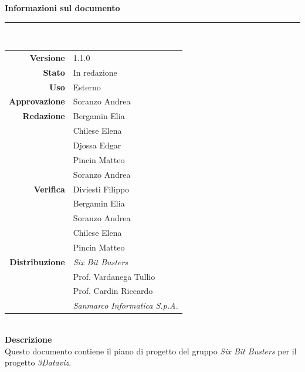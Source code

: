 \begin{titlepage}
\begin{center}
	\large \textbf{Informazioni sul documento} \\
	\rule{0.6\textwidth}{0.4pt}
	\\[0.5cm]
	\begin{tabular}{r|l}
		\textbf{Versione} & 1.1.0\\
		\textbf{Stato} & In redazione\\
		\textbf{Uso} & Esterno\\                         
		\textbf{Approvazione} & Soranzo Andrea\\                      
		\textbf{Redazione} & Bergamin Elia \\ & Chilese Elena \\ & Djossa Edgar \\ & Pincin Matteo\\ & Soranzo Andrea\\
		\textbf{Verifica} &  Diviesti Filippo \\ & Bergamin Elia \\ & Soranzo Andrea \\ & Chilese Elena\\ & Pincin Matteo\\                        
		\textbf{Distribuzione} & \textit{Six Bit Busters} \\ & Prof. Vardanega Tullio \\ & Prof. Cardin Riccardo \\ & \textit{Sanmarco Informatica S.p.A.}
	\end{tabular}	
	\\[0.8cm]

	\large \textbf{Descrizione} \\
	Questo documento contiene il piano di progetto del gruppo \textit{Six Bit Busters} per il progetto \textit{3Dataviz}.
	
	\end{center}
\end{titlepage}
